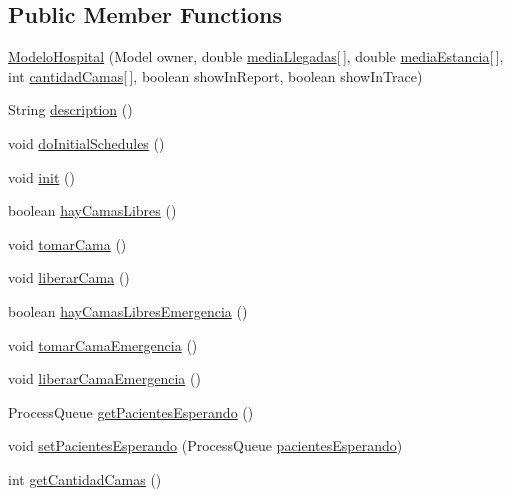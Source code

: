 \subsection*{Public Member Functions}
\begin{DoxyCompactItemize}
\item 
\hyperlink{class_modelo_hospital_a561bc154e141c4dd9967b37968dfa296}{Modelo\-Hospital} (Model owner, double \hyperlink{class_modelo_hospital_a01a673aabc00aff4fa4efecf10e1c628}{media\-Llegadas}\mbox{[}$\,$\mbox{]}, double \hyperlink{class_modelo_hospital_a10dea35940463cb2f7b34e333ac799b9}{media\-Estancia}\mbox{[}$\,$\mbox{]}, int \hyperlink{class_modelo_hospital_a7976b96ea2a7a95f28b9ae175201b54d}{cantidad\-Camas}\mbox{[}$\,$\mbox{]}, boolean show\-In\-Report, boolean show\-In\-Trace)
\item 
String \hyperlink{class_modelo_hospital_a4f87fdd61cdaff2ed5cbb85ea5fd6006}{description} ()
\item 
void \hyperlink{class_modelo_hospital_a3e65c59d620077e3c95993d89840fe69}{do\-Initial\-Schedules} ()
\item 
void \hyperlink{class_modelo_hospital_a7312f74eaa1d274a0e9d5a7a0d620a77}{init} ()
\item 
boolean \hyperlink{class_modelo_hospital_a8dd16235e4f29badaf383670ee81fb36}{hay\-Camas\-Libres} ()
\item 
void \hyperlink{class_modelo_hospital_aea16e0db18328c1e2bf7ec947739e7c6}{tomar\-Cama} ()
\item 
void \hyperlink{class_modelo_hospital_a8c0b523cdf04c197c6640fd950ae1e80}{liberar\-Cama} ()
\item 
boolean \hyperlink{class_modelo_hospital_a4ffee61b106d2d4539ca274b222b16b9}{hay\-Camas\-Libres\-Emergencia} ()
\item 
void \hyperlink{class_modelo_hospital_aa0e95405391c5233eca6546b901d7a2a}{tomar\-Cama\-Emergencia} ()
\item 
void \hyperlink{class_modelo_hospital_a74d6a9a51049b037452f5e49eae2875a}{liberar\-Cama\-Emergencia} ()
\item 
Process\-Queue \hyperlink{class_modelo_hospital_ac97694528846204ccc5ee68534a0f65f}{get\-Pacientes\-Esperando} ()
\item 
void \hyperlink{class_modelo_hospital_abcd57bd92be67fde1e5ef25c3b3dabdf}{set\-Pacientes\-Esperando} (Process\-Queue \hyperlink{class_modelo_hospital_ad0cbe7f57f1733551b2bb33e1a90499a}{pacientes\-Esperando})
\item 
int \hyperlink{class_modelo_hospital_aa7ad6fbccb39812fe5081161b78e257a}{get\-Cantidad\-Camas} ()

\end{DoxyCompactItemize}
